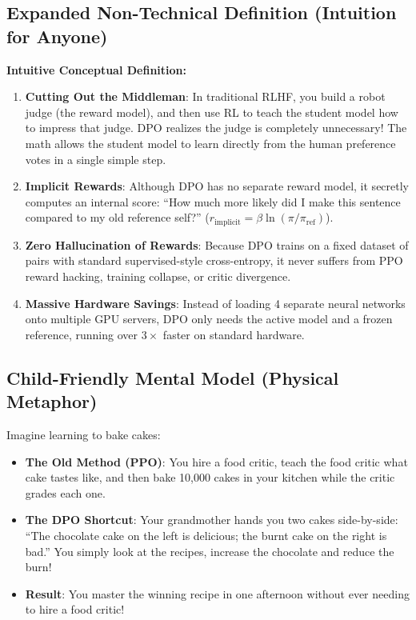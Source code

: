 \documentclass[11pt,a4paper]{article}
\theoremstyle{definition}
\begin{document}
\subsection{Expanded Non-Technical Definition (Intuition for Anyone)}
\textbf{Intuitive Conceptual Definition:}
\begin{enumerate}
    \item \textbf{Cutting Out the Middleman}: In traditional RLHF, you build a robot judge (the reward model), and then use RL to teach the student model how to impress that judge. DPO realizes the judge is completely unnecessary! The math allows the student model to learn directly from the human preference votes in a single simple step.
    \item \textbf{Implicit Rewards}: Although DPO has no separate reward model, it secretly computes an internal score: ``How much more likely did I make this sentence compared to my old reference self?'' ($r_{\text{implicit}} = \beta \ln(\pi / \pi_{\text{ref}})$).
    \item \textbf{Zero Hallucination of Rewards}: Because DPO trains on a fixed dataset of pairs with standard supervised-style cross-entropy, it never suffers from PPO reward hacking, training collapse, or critic divergence.
    \item \textbf{Massive Hardware Savings}: Instead of loading 4 separate neural networks onto multiple GPU servers, DPO only needs the active model and a frozen reference, running over $3\times$ faster on standard hardware.
\end{enumerate}

\subsection{Child-Friendly Mental Model (Physical Metaphor)}
Imagine learning to bake cakes:
\begin{itemize}
    \item \textbf{The Old Method (PPO)}: You hire a food critic, teach the food critic what cake tastes like, and then bake 10,000 cakes in your kitchen while the critic grades each one.
    \item \textbf{The DPO Shortcut}: Your grandmother hands you two cakes side-by-side: ``The chocolate cake on the left is delicious; the burnt cake on the right is bad.'' You simply look at the recipes, increase the chocolate and reduce the burn!
    \item \textbf{Result}: You master the winning recipe in one afternoon without ever needing to hire a food critic!
\end{itemize}
\end{document}
